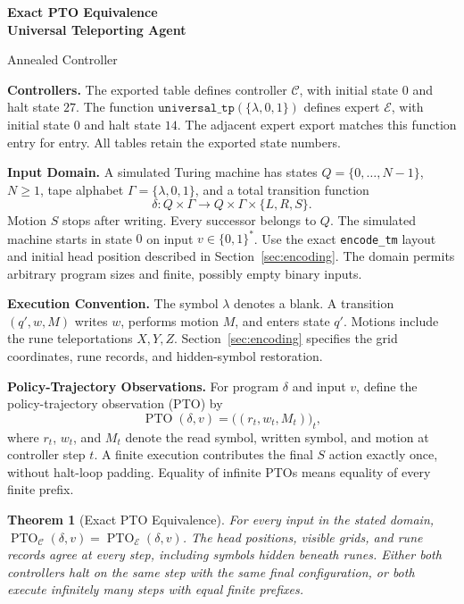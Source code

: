 \documentclass[11pt,a4paper]{article}
\date{}
\newcommand{\blank}{\lambda}
\newcommand{\EXPERT}{\mathcal E}
\newcommand{\CTRL}{\mathcal C}
\newcommand{\PTO}{\operatorname{PTO}}
\newcommand{\code}[1]{\texttt{#1}}
\newtheorem{theorem}{Theorem}
\newcommand{\sectiontitle}[2]{\refstepcounter{section}\vspace*{2pt}{\LARGE\bfseries\color{Teal}\thesection\quad #2}\par\vspace{7pt}}
\begin{document}
{\Huge\bfseries Exact PTO Equivalence\\[3pt]Universal Teleporting Agent}\par
\vspace{10pt}
{\Large Annealed Controller}\par
{\small\color{Muted}}\par
\vspace{7pt}

\vspace{4pt}
\sectiontitle{1 \enspace STATEMENT AND SCOPE}{Statement and Scope}\label{sec:common1}
\textbf{Controllers.}
The exported table  defines controller
$\CTRL$, with initial state $0$ and halt state $27$.
The function $\code{universal\_tp}(\{\blank,0,1\})$ defines expert
$\EXPERT$, with initial state $0$ and halt state $14$.
The adjacent expert export matches this function entry for entry.
All tables retain the exported state numbers.

\textbf{Input Domain.}
A simulated Turing machine has states $Q=\{0,\ldots,N-1\}$, $N\ge1$,
tape alphabet $\Gamma=\{\blank,0,1\}$, and a total transition function
\[
\delta:Q\times\Gamma\longrightarrow Q\times\Gamma\times\{L,R,S\}.
\]
Motion $S$ stops after writing. Every successor belongs to $Q$.
The simulated machine starts in state $0$ on input $v\in\{0,1\}^{*}$.
Use the exact \code{encode\_tm} layout and initial head position described
in Section~\ref{sec:encoding}. The domain permits arbitrary program sizes
and finite, possibly empty binary inputs.

\textbf{Execution Convention.}
The symbol $\blank$ denotes a blank. A transition $(q',w,M)$ writes $w$,
performs motion $M$, and enters state $q'$. Motions include the rune
teleportations $X,Y,Z$. Section~\ref{sec:encoding} specifies the grid
coordinates, rune records, and hidden-symbol restoration.

\textbf{Policy-Trajectory Observations.}
For program $\delta$ and input $v$, define the policy-trajectory observation
(PTO) by
\[
\PTO(\delta,v)=\bigl((r_t,w_t,M_t)\bigr)_t,
\]
where $r_t$, $w_t$, and $M_t$ denote the read symbol, written symbol,
and motion at controller step $t$. A finite execution contributes the final
$S$ action exactly once, without halt-loop padding. Equality of infinite
PTOs means equality of every finite prefix.

\begin{theorem}[Exact PTO Equivalence]\label{thm:main}
For every input in the stated domain,
$\PTO_{\CTRL}(\delta,v)=\PTO_{\EXPERT}(\delta,v)$.
The head positions, visible grids, and rune records agree at every step,
including symbols hidden beneath runes. Either both controllers halt on
the same step with the same final configuration, or both execute infinitely
many steps with equal finite prefixes.
\end{theorem}
\end{document}

